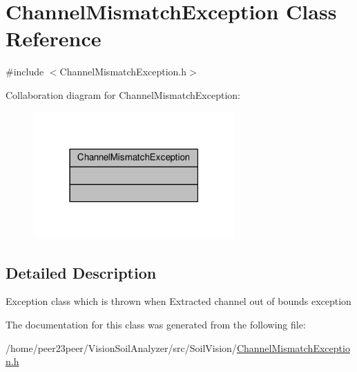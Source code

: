 \hypertarget{class_channel_mismatch_exception}{}\section{Channel\+Mismatch\+Exception Class Reference}
\label{class_channel_mismatch_exception}


{\ttfamily \#include $<$Channel\+Mismatch\+Exception.\+h$>$}



Collaboration diagram for Channel\+Mismatch\+Exception\+:\nopagebreak
\begin{figure}[H]
\begin{center}
\leavevmode
\includegraphics[width=219pt]{class_channel_mismatch_exception__coll__graph}
\end{center}
\end{figure}


\subsection{Detailed Description}
Exception class which is thrown when Extracted channel out of bounds exception 

The documentation for this class was generated from the following file\+:\begin{DoxyCompactItemize}
\item 
/home/peer23peer/\+Vision\+Soil\+Analyzer/src/\+Soil\+Vision/\hyperlink{_channel_mismatch_exception_8h}{Channel\+Mismatch\+Exception.\+h}\end{DoxyCompactItemize}
